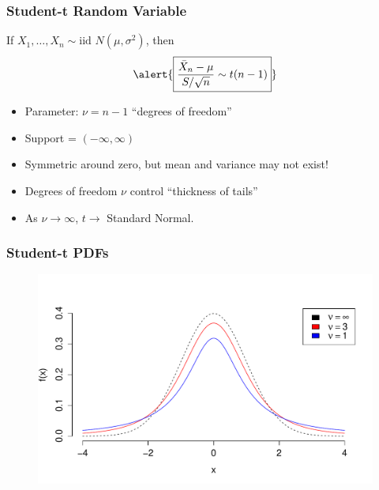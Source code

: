 \begin{frame}
  \frametitle{Student-t Random Variable}
If $X_1, \hdots, X_n \sim \mbox{iid } N(\mu,\sigma^2)$, then
	$$\alert{\boxed{\frac{\bar{X}_n - \mu}{S/\sqrt{n}} \sim t(n-1)}}$$

\pause

\begin{itemize}
  \item Parameter: $\nu = n-1$ ``degrees of freedom'' 
	\item Support = $(-\infty, \infty)$
	\item Symmetric around zero, but mean and variance may not exist!
	\item Degrees of freedom $\nu$ control ``thickness of tails''
	\item As $\nu \rightarrow \infty$, $t \rightarrow$ Standard Normal.
\end{itemize}
\vspace{1em}


\end{frame}

\begin{frame}
\frametitle{Student-t PDFs}

\begin{figure}
\includegraphics[scale = 0.58]{./images/tpdf}
\end{figure}
\end{frame}

